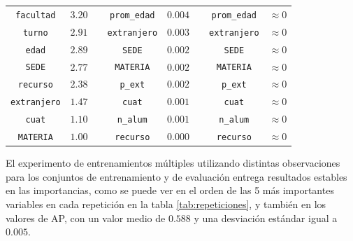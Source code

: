\documentclass[a4paper,11pt,dvipsnames]{article}
\begin{document}
\begin{table}[!ht]
\begin{center}
\begin{tabular}{cccccccc}
    \texttt{facultad} & $3.20$ && \texttt{prom\_edad} & $0.004$ && \texttt{prom\_edad} & $\approx 0$\\
    \texttt{turno} & $2.91$ && \texttt{extranjero} & $0.003$ && \texttt{extranjero} & $\approx 0$\\
    \texttt{edad} & $2.89$ && \texttt{SEDE} & $0.002$ && \texttt{SEDE} & $\approx 0$ \\
    \texttt{SEDE} & $2.77$ && \texttt{MATERIA} & $0.002$ && \texttt{MATERIA} & $\approx 0$\\
    \texttt{recurso} & $2.38$ && \texttt{p\_ext} & $0.002$ && \texttt{p\_ext} & $\approx 0$ \\
    \texttt{extranjero} & $1.47$ && \texttt{cuat} & $0.001$ && \texttt{cuat} & $\approx 0$\\
    \texttt{cuat} & $1.10$ && \texttt{n\_alum} & $0.001$ && \texttt{n\_alum} & $\approx 0$\\
    \texttt{MATERIA} & $1.00$ && \texttt{recurso} & $0.000$ && \texttt{recurso} & $\approx 0$\\
    \hline
    \end{tabular}
    \label{tab:impbase}
    \end{center}
\end{table}

El experimento de entrenamientos múltiples utilizando distintas observaciones para los conjuntos de entrenamiento y de evaluación entrega resultados estables en las importancias, como se puede ver en el orden de las 5 más importantes variables en cada repetición en la tabla \ref{tab:repeticiones}, y también en los valores de AP, con un valor medio de $0.588$ y una desviación estándar igual a $0.005$.\par\medskip
\end{document}
